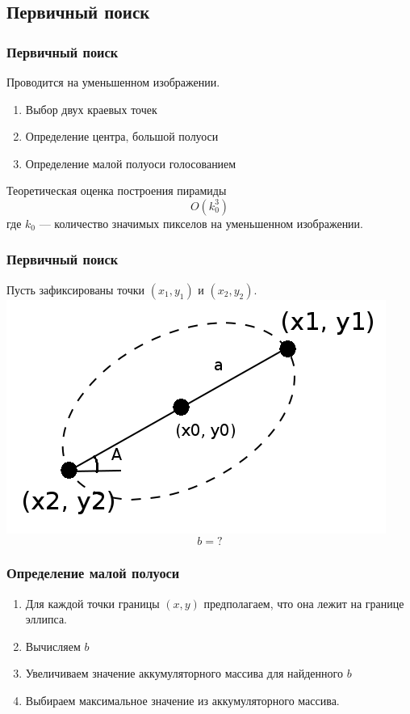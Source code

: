 \documentclass[14pt]{beamer}
\begin{document}
\subsection{Первичный поиск}
\begin{frame}
\frametitle{Первичный поиск}
Проводится на уменьшенном изображении.
\begin{block}{}
\begin{enumerate}
  \item Выбор двух краевых точек
  \item Определение центра, большой полуоси
  \item Определение малой полуоси голосованием
\end{enumerate}
\end{block}
\begin{block}{Теоретическая оценка построения пирамиды}
$$O(k_0^3)$$ где $k_0$ --- количество значимых пикселов на уменьшенном изображении.
\end{block}
\end{frame}

\begin{frame}
\frametitle{Первичный поиск}
Пусть зафиксированы точки $(x_1, y_1)$ и $(x_2, y_2)$.
  \center
\includegraphics[width=0.40\linewidth]{ellipse1}
$$b = ?$$
\end{frame}

\begin{frame}
\frametitle{Определение малой полуоси}
\begin{block}{}
\begin{enumerate}
  \item Для каждой точки границы $(x, y)$ предполагаем, что она лежит на границе эллипса.
  \item Вычисляем $b$
  \item Увеличиваем значение аккумуляторного массива для найденного $b$
  \item Выбираем максимальное значение из аккумуляторного массива.
\end{enumerate}
\end{block}
\end{frame}
\end{document}
